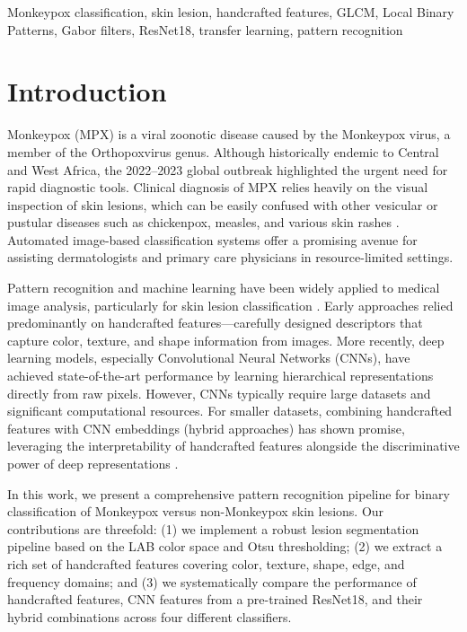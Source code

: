 \documentclass[conference]{IEEEtran}
\begin{document}
\begin{IEEEkeywords}
Monkeypox classification, skin lesion, handcrafted features, GLCM,
Local Binary Patterns, Gabor filters, ResNet18, transfer learning,
pattern recognition
\end{IEEEkeywords}

\section{Introduction}
\label{sec:intro}

Monkeypox (MPX) is a viral zoonotic disease caused by the Monkeypox
virus, a member of the Orthopoxvirus genus. Although historically
endemic to Central and West Africa, the 2022--2023 global outbreak
highlighted the urgent need for rapid diagnostic tools. Clinical
diagnosis of MPX relies heavily on the visual inspection of skin
lesions, which can be easily confused with other vesicular or
pustular diseases such as chickenpox, measles, and various skin
rashes \cite{who_mpx}. Automated image-based classification systems
offer a promising avenue for assisting dermatologists and primary
care physicians in resource-limited settings.

Pattern recognition and machine learning have been widely applied to
medical image analysis, particularly for skin lesion classification
\cite{codella2018skin}. Early approaches relied predominantly on
handcrafted features---carefully designed descriptors that capture
color, texture, and shape information from images. More recently, deep
learning models, especially Convolutional Neural Networks (CNNs),
have achieved state-of-the-art performance by learning hierarchical
representations directly from raw pixels. However, CNNs typically
require large datasets and significant computational resources. For
smaller datasets, combining handcrafted features with CNN embeddings
(hybrid approaches) has shown promise, leveraging the interpretability
of handcrafted features alongside the discriminative power of deep
representations \cite{ozkan2021deep}.

In this work, we present a comprehensive pattern recognition pipeline
for binary classification of Monkeypox versus non-Monkeypox skin
lesions. Our contributions are threefold: (1) we implement a robust
lesion segmentation pipeline based on the LAB color space and Otsu
thresholding; (2) we extract a rich set of handcrafted features
covering color, texture, shape, edge, and frequency domains; and (3)
we systematically compare the performance of handcrafted features,
CNN features from a pre-trained ResNet18, and their hybrid
combinations across four different classifiers.
\end{document}
